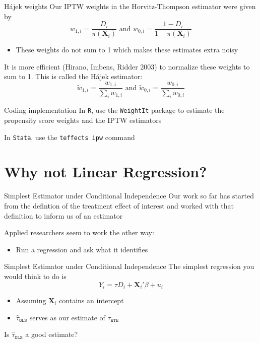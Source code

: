 \documentclass[aspectratio=169,t,11pt,table]{beamer}
\begin{document}
\begin{frame}{Hájek weights}
  Our IPTW weights in the Horvitz-Thompson estimator were given by 
  $$
    w_{1,i} = \frac{D_i}{\pi(\bm{X}_i)} \text{ and } w_{0,i} = \frac{1 - D_i}{1 - \pi(\bm{X}_i)}
  $$
  \begin{itemize}
    \item These weights do not sum to 1 which makes these estimates extra noisy
  \end{itemize}

  \bigskip
  \pause
  It is more efficient (Hirano, Imbens, Ridder 2003) to normalize these weights to sum to 1. This is called the Hájek estimator:
  $$
    \tilde{w}_{1,i} = \frac{w_{1,i}}{\sum_i w_{1,i}} \text{ and } \tilde{w}_{0,i} = \frac{w_{0,i}}{\sum_i w_{0,i}} 
  $$
\end{frame}

\begin{frame}{Coding implementation}
  In \texttt{R}, use the \texttt{WeightIt} package to estimate the propensity score weights and the IPTW estimators

  \bigskip
  In \texttt{Stata}, use the \texttt{teffects ipw} command
\end{frame}



\section{Why not Linear Regression?}

\begin{frame}{Simplest Estimator under Conditional Independence}
  Our work so far has started from the defintion of the treatment effect of interest and worked with that definition to inform us of an estimator

  \bigskip
  Applied researchers seem to work the other way:
  \begin{itemize}
    \item Run a regression and ask what it identifies
  \end{itemize}
\end{frame}

\begin{frame}{Simplest Estimator under Conditional Independence}
  The simplest regression you would think to do is 
  $$
    Y_i = \tau D_i + \bm{X}_i' \beta + u_i
  $$
  \begin{itemize}
    \item Assuming $\bm{X}_i$ contains an intercept

    \item $\hat{\tau}_{\texttt{OLS}}$ serves as our estimate of $\tau_{\texttt{ATE}}$
  \end{itemize}

  \bigskip 
  Is $\hat{\tau}_{\texttt{OLS}}$ a good estimate?
\end{frame}
\end{document}

